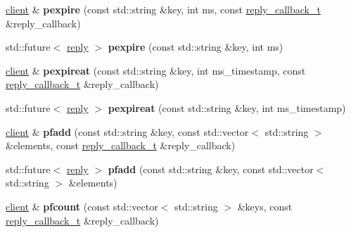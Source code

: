 \begin{DoxyCompactItemize}
\mbox{\hyperlink{classcpp__redis_1_1client}{client}} \& {\bfseries pexpire} (const std\+::string \&key, int ms, const \mbox{\hyperlink{classcpp__redis_1_1client_af7a65eb21aa25230bfbb0b0203c4fc04}{reply\+\_\+callback\+\_\+t}} \&reply\+\_\+callback)
\item 
\mbox{\label{classcpp__redis_1_1client_aa0974d486cae342eced35d64c6e68d40}} 
std\+::future$<$ \mbox{\hyperlink{classcpp__redis_1_1reply}{reply}} $>$ {\bfseries pexpire} (const std\+::string \&key, int ms)
\item 
\mbox{\label{classcpp__redis_1_1client_a7c872e32ed28a78515c1711e4cafbabf}} 
\mbox{\hyperlink{classcpp__redis_1_1client}{client}} \& {\bfseries pexpireat} (const std\+::string \&key, int ms\+\_\+timestamp, const \mbox{\hyperlink{classcpp__redis_1_1client_af7a65eb21aa25230bfbb0b0203c4fc04}{reply\+\_\+callback\+\_\+t}} \&reply\+\_\+callback)
\item 
\mbox{\label{classcpp__redis_1_1client_af7aeaf2681d57fc30c8535c8d5df1e72}} 
std\+::future$<$ \mbox{\hyperlink{classcpp__redis_1_1reply}{reply}} $>$ {\bfseries pexpireat} (const std\+::string \&key, int ms\+\_\+timestamp)
\item 
\mbox{\label{classcpp__redis_1_1client_ade84308f3ef8bfc75c092388ec538469}} 
\mbox{\hyperlink{classcpp__redis_1_1client}{client}} \& {\bfseries pfadd} (const std\+::string \&key, const std\+::vector$<$ std\+::string $>$ \&elements, const \mbox{\hyperlink{classcpp__redis_1_1client_af7a65eb21aa25230bfbb0b0203c4fc04}{reply\+\_\+callback\+\_\+t}} \&reply\+\_\+callback)
\item 
\mbox{\label{classcpp__redis_1_1client_ac6534e0aaf0ef3c87e312b12fd1a5a97}} 
std\+::future$<$ \mbox{\hyperlink{classcpp__redis_1_1reply}{reply}} $>$ {\bfseries pfadd} (const std\+::string \&key, const std\+::vector$<$ std\+::string $>$ \&elements)
\item 
\mbox{\label{classcpp__redis_1_1client_acf88e97aac689b64af0e73843811d837}} 
\mbox{\hyperlink{classcpp__redis_1_1client}{client}} \& {\bfseries pfcount} (const std\+::vector$<$ std\+::string $>$ \&keys, const \mbox{\hyperlink{classcpp__redis_1_1client_af7a65eb21aa25230bfbb0b0203c4fc04}{reply\+\_\+callback\+\_\+t}} \&reply\+\_\+callback)

\end{DoxyCompactItemize}
